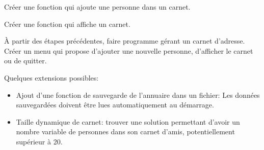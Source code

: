 \documentclass[10pt]{article}\usepackage[correction,nu]{esial}
\begin{document}
\Question Créer une fonction qui ajoute une personne dans un carnet.

\Question Créer une fonction qui affiche un carnet.

\Question À partir des étapes précédentes, faire programme gérant un carnet
d'adresse. Créer un menu qui propose d'ajouter une nouvelle personne,
d'afficher le carnet ou de quitter.

\Question Quelques  extensions possibles:
\begin{itemize}
\item Ajout d'une fonction de sauvegarde de l'annuaire dans un
  fichier: Les données sauvegardées doivent être lues automatiquement
  au démarrage.
\item Taille dynamique de carnet: trouver une solution permettant
  d'avoir un nombre variable de personnes dans son carnet d'amis,
  potentiellement supérieur à 20.
\end{itemize}





\end{document}
